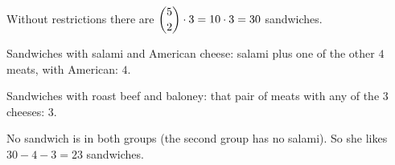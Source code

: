 Without restrictions there are $\dbinom52\cdot3=10\cdot3=30$ sandwiches.

Sandwiches with salami and American cheese: salami plus one of the other $4$ meats, with American: $4$.

Sandwiches with roast beef and baloney: that pair of meats with any of the $3$ cheeses: $3$.

No sandwich is in both groups (the second group has no salami). So she likes $30-4-3=\boxed{23}$ sandwiches.
